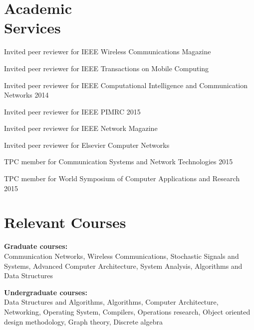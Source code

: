 \documentclass[margin,line]{resume}
\begin{document}
\begin{resume}
    \section{\mysidestyle Academic\\Services}
\begin{list2}
\item Invited peer reviewer for IEEE Wireless Communications Magazine
\item Invited peer reviewer for IEEE Transactions on Mobile Computing
\item Invited peer reviewer for IEEE Computational Intelligence and Communication Networks 2014
\item Invited peer reviewer for IEEE PIMRC 2015
\item Invited peer reviewer for IEEE Network Magazine
\item Invited peer reviewer for Elsevier Computer Networks
\item TPC member for Communication Systems and Network Technologies 2015
\item TPC member for World Symposium of Computer Applications and Research 2015
\end{list2}


%
\section{\mysidestyle Relevant Courses} 
\begin{list2}
\item \textbf{Graduate courses:}\\
Communication Networks, Wireless Communications, Stochastic Signals and Systems, Advanced Computer Architecture, System Analysis, Algorithms and Data Structures\\

\item \textbf{Undergraduate courses:}\\
Data Structures and Algorithms, Algorithms, Computer Architecture, Networking, Operating System, Compilers, Operations research, Object oriented design methodology, Graph theory, Discrete algebra
\end{list2}


\end{resume}
\end{document}
